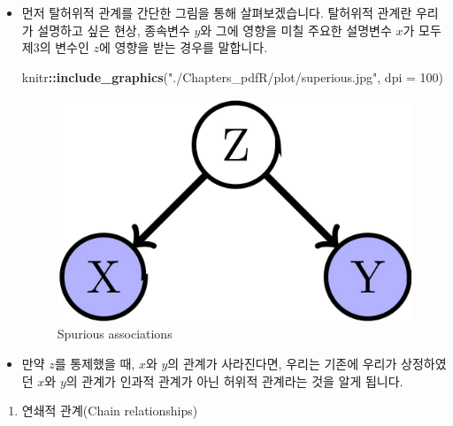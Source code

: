 \documentclass[]{book}
\newenvironment{Shaded}{\begin{snugshade}}{\end{snugshade}}
\newcommand{\DataTypeTok}[1]{\textcolor[rgb]{0.13,0.29,0.53}{#1}}
\newcommand{\DecValTok}[1]{\textcolor[rgb]{0.00,0.00,0.81}{#1}}
\newcommand{\KeywordTok}[1]{\textcolor[rgb]{0.13,0.29,0.53}{\textbf{#1}}}
\newcommand{\NormalTok}[1]{#1}
\newcommand{\OperatorTok}[1]{\textcolor[rgb]{0.81,0.36,0.00}{\textbf{#1}}}
\newcommand{\StringTok}[1]{\textcolor[rgb]{0.31,0.60,0.02}{#1}}
\providecommand{\tightlist}{%
  \setlength{\itemsep}{0pt}\setlength{\parskip}{0pt}}
\begin{document}
\begin{itemize}
\item
  먼저 탈허위적 관계를 간단한 그림을 통해 살펴보겠습니다. 탈허위적 관계란 우리가 설명하고 싶은 현상, 종속변수 \(y\)와 그에 영향을 미칠 주요한 설명변수 \(x\)가 모두 제3의 변수인 \(z\)에 영향을 받는 경우를 말합니다.

\begin{Shaded}
\begin{Highlighting}[]
\NormalTok{knitr}\OperatorTok{::}\KeywordTok{include_graphics}\NormalTok{(}\StringTok{"./Chapters_pdfR/plot/superious.jpg"}\NormalTok{, }\DataTypeTok{dpi =} \DecValTok{100}\NormalTok{)}
\end{Highlighting}
\end{Shaded}

  \begin{figure}

  {\centering \includegraphics[width=12.8in]{./Chapters_pdfR/plot/superious} 

  }

  \caption{Spurious associations}\label{fig:unnamed-chunk-219}
  \end{figure}
\item
  만약 \(z\)를 통제했을 때, \(x\)와 \(y\)의 관계가 사라진다면, 우리는 기존에 우리가 상정하였던 \(x\)와 \(y\)의 관계가 인과적 관계가 아닌 허위적 관계라는 것을 알게 됩니다.
\end{itemize}

\begin{enumerate}
\def\labelenumi{\arabic{enumi}.}
\setcounter{enumi}{1}
\tightlist
\item
  연쇄적 관계(Chain relationships)
\end{enumerate}
\end{document}
